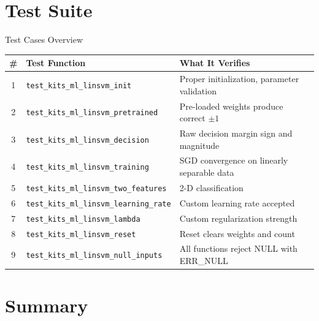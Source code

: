 \documentclass[aspectratio=169, 10pt]{beamer}
\begin{document}
\section{Test Suite}

\begin{frame}{Test Cases Overview}
\begin{table}
\centering
\small
\begin{tabular}{@{}clp{7cm}@{}}
\toprule
\textbf{\#} & \textbf{Test Function} & \textbf{What It Verifies} \\
\midrule
1 & \texttt{test\_kits\_ml\_linsvm\_init}
  & Proper initialization, parameter validation \\
2 & \texttt{test\_kits\_ml\_linsvm\_pretrained}
  & Pre-loaded weights produce correct $\pm 1$ \\
3 & \texttt{test\_kits\_ml\_linsvm\_decision}
  & Raw decision margin sign and magnitude \\
4 & \texttt{test\_kits\_ml\_linsvm\_training}
  & SGD convergence on linearly separable data \\
5 & \texttt{test\_kits\_ml\_linsvm\_two\_features}
  & 2-D classification \\
6 & \texttt{test\_kits\_ml\_linsvm\_learning\_rate}
  & Custom learning rate accepted \\
7 & \texttt{test\_kits\_ml\_linsvm\_lambda}
  & Custom regularization strength \\
8 & \texttt{test\_kits\_ml\_linsvm\_reset}
  & Reset clears weights and count \\
9 & \texttt{test\_kits\_ml\_linsvm\_null\_inputs}
  & All functions reject NULL with ERR\_NULL \\
\bottomrule
\end{tabular}
\end{table}
\end{frame}

\section{Summary}
\end{document}
